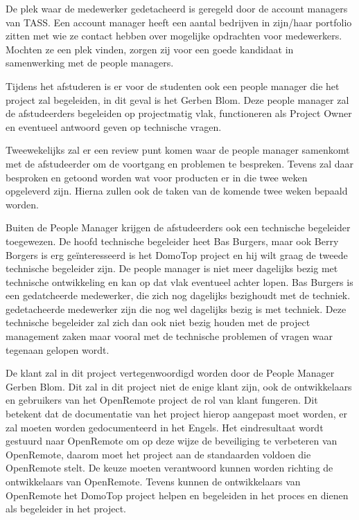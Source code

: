 \documentclass[]{article}
\begin{document}
De plek waar de medewerker gedetacheerd is geregeld door de account
managers van TASS. Een account manager heeft een aantal bedrijven in
zijn/haar portfolio zitten met wie ze contact hebben over mogelijke
opdrachten voor medewerkers. Mochten ze een plek vinden, zorgen zij voor
een goede kandidaat in samenwerking met de people managers.

Tijdens het afstuderen is er voor de studenten ook een people manager
die het project zal begeleiden, in dit geval is het Gerben Blom. Deze
people manager zal de afstudeerders begeleiden op projectmatig vlak,
functioneren als Project Owner en eventueel antwoord geven op technische
vragen.

Tweewekelijks zal er een review punt komen waar de people manager
samenkomt met de afstudeerder om de voortgang en problemen te bespreken.
Tevens zal daar besproken en getoond worden wat voor producten er in die twee weken
opgeleverd zijn. Hierna zullen ook de taken van de komende twee weken
bepaald worden.

Buiten de People Manager krijgen de afstudeerders ook een technische
begeleider toegewezen. De hoofd technische begeleider heet Bas Burgers,
maar ook Berry Borgers is erg ge\"interesseerd is het DomoTop project en hij
wilt graag de tweede technische begeleider zijn. De people manager is
niet meer dagelijks bezig met technische ontwikkeling en kan op dat vlak
eventueel achter lopen. Bas Burgers is een gedatcheerde medewerker, die zich nog
dagelijks bezighoudt met de techniek.
gedetacheerde medewerker zijn die nog wel dagelijks bezig is met techniek.
Deze technische begeleider zal zich dan ook niet bezig houden met de
project management zaken maar vooral met de technische problemen of vragen
waar tegenaan gelopen wordt.

De klant zal in dit project vertegenwoordigd worden door de People Manager
Gerben Blom. Dit zal in dit project niet de enige klant zijn, ook de
ontwikkelaars en gebruikers van het OpenRemote project de rol van klant
fungeren. Dit betekent dat de documentatie van het project hierop aangepast
moet worden, er zal moeten worden gedocumenteerd in het Engels.  
Het eindresultaat wordt gestuurd naar OpenRemote om op deze wijze de beveiliging
te verbeteren van OpenRemote, daarom moet het project aan de standaarden voldoen die OpenRemote stelt. 
De keuze moeten verantwoord kunnen worden richting de ontwikkelaars van
OpenRemote. Tevens kunnen de ontwikkelaars van OpenRemote het DomoTop project helpen en begeleiden
in het proces en dienen als begeleider in het project.
\end{document}
